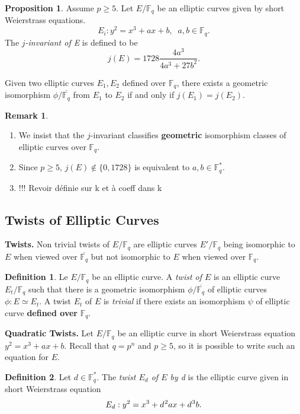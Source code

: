 \documentclass[10pt]{article}
\theoremstyle{definition}
\newtheorem{definition}{Definition}
\newtheorem{proposition}{Proposition}
\newtheorem{remark}{Remark}
\newcommand{\F}{\mathbb{F}}
\begin{document}
\begin{proposition}
Assume $p \geq 5$.
Let $E/\F_q$ be an elliptic curves given by short Weierstrass equations.
\[ E_i : y^2 = x^3 + ax + b, \; \; a, b \in \F_q. \]
The \textsl{$j$-invariant of E} is defined to be 
\[j(E) = 1728 \frac{4a^3}{4a^3+27b^2}.\]

Given two elliptic curves $E_1, E_2$ defined over $\F_q$, there exists a geometric isomorphism $\phi / \overline{\F_q}$ from $E_1$ to $E_2$ if and only if $j(E_1) = j(E_2)$. 
\end{proposition}

\noindent \begin{remark}
\begin{enumerate}
\item We insist that the $j$-invariant classifies \textbf{geometric} isomorphism classes of elliptic curves over $\F_q$. 
\item Since $p \geq 5$, $j(E) \notin \lbrace 0, 1728 \rbrace $ is equivalent to $a,b \in \F_q^{*}$.
\item !!! Revoir définie sur k et à coeff dans k
\end{enumerate}
\end{remark}

\subsection{Twists of Elliptic Curves}

\noindent \textbf{Twists.} Non trivial twists of $E/\F_q$ are elliptic curves $E'/\F_q$ being isomorphic to $E$ when viewed over $\overline{\F_q}$ but not isomorphic to $E$ when viewed over $\F_q$.

\begin{definition}
Le $E/\F_q$ be an elliptic curve.
A \textsl{twist of $E$} is an elliptic curve $E_t/\F_q$ such that there is a geometric isomorphism $\phi/\overline{\F_q}$ of elliptic curves $\phi : E \simeq E_t$.
A twist $E_t$ of $E$ is \textsl{trivial} if there exists an isomorphism $\psi$ of elliptic curve \textbf{defined over} $\F_q$.
\end{definition}

\vspace*{.5cm}
\noindent \textbf{Quadratic Twists.} Let $E/\F_q$ be an elliptic curve in short Weierstrass equation $y^2 = x^3+ax+b$.
Recall that $q = p^n$ and $p \geq 5$, so it is possible to write such an equation for $E$. 

\begin{definition}
Let $d \in \F_q^*$.
The \textsl{twist $E_d$ of $E$ by d} is the elliptic curve given in short Weierstrass equation
\[ E_d : y^2 = x^3 + d^{\mkern1mu 2}ax + d^{\mkern1mu 3}b.\]
\end{definition}
\end{document}
